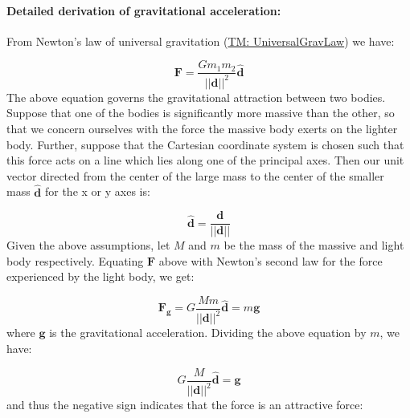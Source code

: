 \documentclass[12pt]{article}
\begin{document}
\paragraph{Detailed derivation of gravitational acceleration:}
\label{GD:accelGravityDeriv}
From Newton's law of universal gravitation (\hyperref[TM:UniversalGravLaw]{TM: UniversalGravLaw}) we have:

\begin{displaymath}
\mathbf{F}=\frac{G {m_{1}} {m_{2}}}{{\text{||}\mathbf{d}\text{||}^{2}}} \mathbf{\hat{d}}
\end{displaymath}
The above equation governs the gravitational attraction between two bodies. Suppose that one of the bodies is significantly more massive than the other, so that we concern ourselves with the force the massive body exerts on the lighter body. Further, suppose that the Cartesian coordinate system is chosen such that this force acts on a line which lies along one of the principal axes. Then our unit vector directed from the center of the large mass to the center of the smaller mass $\mathbf{\hat{d}}$ for the x or y axes is:

\begin{displaymath}
\mathbf{\hat{d}}=\frac{\mathbf{d}}{\text{||}\mathbf{d}\text{||}}
\end{displaymath}
Given the above assumptions, let $M$ and $m$ be the mass of the massive and light body respectively. Equating $\mathbf{F}$ above with Newton's second law for the force experienced by the light body, we get:

\begin{displaymath}
{\mathbf{F}_{\mathbf{g}}}=G \frac{M m}{{\text{||}\mathbf{d}\text{||}^{2}}} \mathbf{\hat{d}}=m \mathbf{g}
\end{displaymath}
where $\mathbf{g}$ is the gravitational acceleration. Dividing the above equation by $m$,  we have:

\begin{displaymath}
G \frac{M}{{\text{||}\mathbf{d}\text{||}^{2}}} \mathbf{\hat{d}}=\mathbf{g}
\end{displaymath}
and thus the negative sign indicates that the force is an attractive force:
\end{document}

